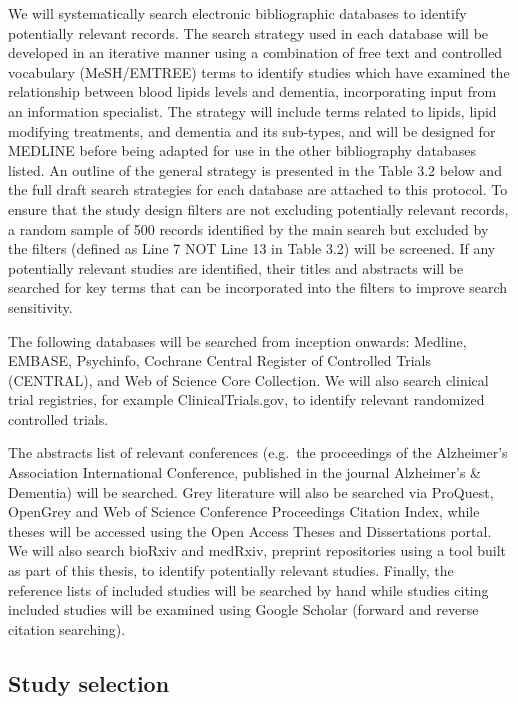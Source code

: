 \documentclass[a4paper, twoside]{templates/ociamthesis}
\begin{document}
We will systematically search electronic bibliographic databases to identify potentially relevant records. The search strategy used in each database will be developed in an iterative manner using a combination of free text and controlled vocabulary (MeSH/EMTREE) terms to identify studies which have examined the relationship between blood lipids levels and dementia, incorporating input from an information specialist. The strategy will include terms related to lipids, lipid modifying treatments, and dementia and its sub-types, and will be designed for MEDLINE before being adapted for use in the other bibliography databases listed. An outline of the general strategy is presented in the Table 3.2 below and the full draft search strategies for each database are attached to this protocol. To ensure that the study design filters are not excluding potentially relevant records, a random sample of 500 records identified by the main search but excluded by the filters (defined as Line 7 NOT Line 13 in Table 3.2) will be screened. If any potentially relevant studies are identified, their titles and abstracts will be searched for key terms that can be incorporated into the filters to improve search sensitivity.

The following databases will be searched from inception onwards: Medline, EMBASE, Psychinfo, Cochrane Central Register of Controlled Trials (CENTRAL), and Web of Science Core Collection. We will also search clinical trial registries, for example ClinicalTrials.gov, to identify relevant randomized controlled trials.

The abstracts list of relevant conferences (e.g.~the proceedings of the Alzheimer's Association International Conference, published in the journal Alzheimer's \& Dementia) will be searched. Grey literature will also be searched via ProQuest, OpenGrey and Web of Science Conference Proceedings Citation Index, while theses will be accessed using the Open Access Theses and Dissertations portal. We will also search bioRxiv and medRxiv, preprint repositories using a tool built as part of this thesis, to identify potentially relevant studies. Finally, the reference lists of included studies will be searched by hand while studies citing included studies will be examined using Google Scholar (forward and reverse citation searching).

\hypertarget{study-selection}{%
\subsection{Study selection}\label{study-selection}}
\end{document}
